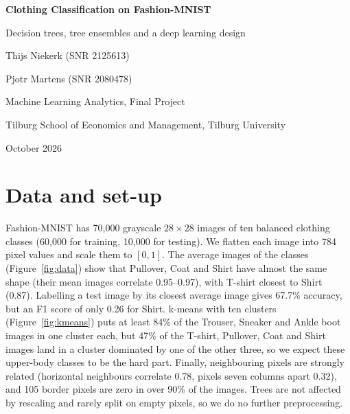 \documentclass[11pt,a4paper]{article}
\begin{document}
\begin{titlepage}
\centering
\vspace*{4cm}
{\LARGE\bfseries Clothing Classification on Fashion-MNIST\par}
\vspace{0.4cm}
{\large Decision trees, tree ensembles and a deep learning design\par}
\vspace{2.5cm}
{\large Thijs Niekerk \quad (SNR 2125613)\par}
\vspace{0.15cm}
{\large Pjotr Martens \quad (SNR 2080478)\par}
\vfill
{Machine Learning Analytics, Final Project\par}
\vspace{0.15cm}
{Tilburg School of Economics and Management, Tilburg University\par}
\vspace{0.15cm}
{October 2026\par}
\vspace*{1.5cm}
\end{titlepage}
\setcounter{page}{1}

\section{Data and set-up}
\label{sec:data}
Fashion-MNIST \citep{xiao2017} has 70{,}000 grayscale $28\times28$ images of ten balanced clothing classes (60{,}000 for training, 10{,}000 for testing). We flatten each image into 784 pixel values and scale them to $[0,1]$. The average images of the classes (Figure~\ref{fig:data}) show that Pullover, Coat and Shirt have almost the same shape (their mean images correlate 0.95--0.97), with T-shirt closest to Shirt (0.87). Labelling a test image by its closest average image gives 67.7\% accuracy, but an F1 score of only 0.26 for Shirt. k-means with ten clusters (Figure~\ref{fig:kmeans}) puts at least 84\% of the Trouser, Sneaker and Ankle boot images in one cluster each, but 47\% of the T-shirt, Pullover, Coat and Shirt images land in a cluster dominated by one of the other three, so we expect these upper-body classes to be the hard part. Finally, neighbouring pixels are strongly related (horizontal neighbours correlate 0.78, pixels seven columns apart 0.32), and 105 border pixels are zero in over 90\% of the images. Trees are not affected by rescaling and rarely split on empty pixels, so we do no further preprocessing.
\end{document}
